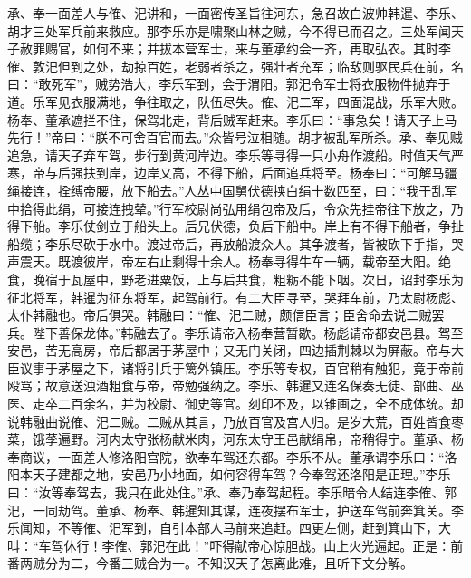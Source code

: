 承、奉一面差人与傕、汜讲和，一面密传圣旨往河东，急召故白波帅韩暹、李乐、胡才三处军兵前来救应。那李乐亦是啸聚山林之贼，今不得已而召之。三处军闻天子赦罪赐官，如何不来；并拔本营军士，来与董承约会一齐，再取弘农。其时李傕、敦汜但到之处，劫掠百姓，老弱者杀之，强壮者充军；临敌则驱民兵在前，名曰：“敢死军”，贼势浩大，李乐军到，会于渭阳。郭汜令军士将衣服物件抛弃于道。乐军见衣服满地，争往取之，队伍尽失。傕、汜二军，四面混战，乐军大败。杨奉、董承遮拦不住，保驾北走，背后贼军赶来。李乐曰：“事急矣！请天子上马先行！”帝曰：“朕不可舍百官而去。”众皆号泣相随。胡才被乱军所杀。承、奉见贼追急，请天子弃车驾，步行到黄河岸边。李乐等寻得一只小舟作渡船。时值天气严寒，帝与后强扶到岸，边岸又高，不得下船，后面追兵将至。杨奉曰：“可解马疆绳接连，拴缚帝腰，放下船去。”人丛中国舅伏德挟白绢十数匹至，曰：“我于乱军中拾得此绢，可接连拽辇。”行军校尉尚弘用绢包帝及后，令众先挂帝往下放之，乃得下船。李乐仗剑立于船头上。后兄伏德，负后下船中。岸上有不得下船者，争扯船缆；李乐尽砍于水中。渡过帝后，再放船渡众人。其争渡者，皆被砍下手指，哭声震天。既渡彼岸，帝左右止剩得十余人。杨奉寻得牛车一辆，载帝至大阳。绝食，晚宿于瓦屋中，野老进粟饭，上与后共食，粗粝不能下咽。次日，诏封李乐为征北将军，韩暹为征东将军，起驾前行。有二大臣寻至，哭拜车前，乃太尉杨彪、太仆韩融也。帝后俱哭。韩融曰：“傕、汜二贼，颇信臣言；臣舍命去说二贼罢兵。陛下善保龙体。”韩融去了。李乐请帝入杨奉营暂歇。杨彪请帝都安邑县。驾至安邑，苦无高房，帝后都居于茅屋中；又无门关闭，四边插荆棘以为屏蔽。帝与大臣议事于茅屋之下，诸将引兵于篱外镇压。李乐等专权，百官稍有触犯，竟于帝前殴骂；故意送浊酒粗食与帝，帝勉强纳之。李乐、韩暹又连名保奏无徒、部曲、巫医、走卒二百余名，并为校尉、御史等官。刻印不及，以锥画之，全不成体统。却说韩融曲说傕、汜二贼。二贼从其言，乃放百官及宫人归。是岁大荒，百姓皆食枣菜，饿莩遍野。河内太守张杨献米肉，河东太守王邑献绢帛，帝稍得宁。董承、杨奉商议，一面差人修洛阳宫院，欲奉车驾还东都。李乐不从。董承谓李乐曰：“洛阳本天子建都之地，安邑乃小地面，如何容得车驾？今奉驾还洛阳是正理。”李乐曰：“汝等奉驾去，我只在此处住。”承、奉乃奉驾起程。李乐暗令人结连李傕、郭汜，一同劫驾。董承、杨奉、韩暹知其谋，连夜摆布军士，护送车驾前奔箕关。李乐闻知，不等傕、汜军到，自引本部人马前来追赶。四更左侧，赶到箕山下，大叫：“车驾休行！李傕、郭汜在此！”吓得献帝心惊胆战。山上火光遍起。正是：前番两贼分为二，今番三贼合为一。不知汉天子怎离此难，且听下文分解。